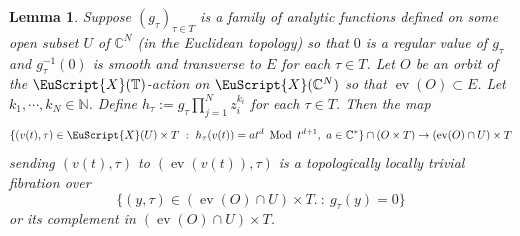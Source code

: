 \documentclass[11pt]{amsart}
\newtheorem{lemma}[thm]{Lemma}
\newcommand{\scrX}{\EuScript{X}}
\newcommand{\bC}{\mathbb{C}}
\newcommand{\bN}{\mathbb{N}}
\numberwithin{equation}{section}
\newcommand{\bT}{\mathbb{T}}
\newcommand{\ev}{\operatorname{ev}}
\newcommand{\Mod}{\operatorname{Mod}}
\begin{document}
\begin{lemma} \label{lemmaarcspaceintersection}
	Suppose $(g_\tau)_{\tau \in T}$ is a family of analytic functions defined on some open subset $U$ of $\bC^N$ (in the Euclidean topology)
	so that $0$ is a regular value of $g_\tau$ and $g_\tau^{-1}(0)$ is smooth and transverse to $E$ for each $\tau \in T$.
	Let $O$ be an orbit of the $\scrX(\bT)$-action on $\scrX(\bC^N)$ so that $\ev(O) \subset E$.
	Let $k_1,\cdots,k_N \in \bN$.
	Define $h_\tau := g_\tau \prod_{j=1}^N z_i^{k_i}$ for each $\tau \in T$.
	Then the map
	\begin{equation} \label{eqnprojectiontoT}
		\{ (v(t),\tau) \in \scrX(U) \times T \ : \ h_\tau(v(t)) = a t^d \ \Mod \ t^{d+1}, \ a \in \bC^* \} \cap (O \times T) \to (\ev(O) \cap U) \times T
	\end{equation}
	sending $(v(t),\tau)$ to $(\ev(v(t)),\tau)$ is a topologically locally trivial fibration over
	\begin{equation} \label{eqnfibrationregion}
		\{(y,\tau) \in (\ev(O) \cap U) \times T. \ : \ g_\tau(y)=0\}
	\end{equation}
	or its complement in $(\ev(O) \cap U) \times T$.
\end{lemma}
\end{document}
